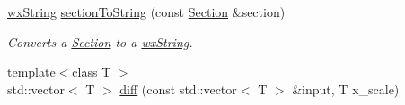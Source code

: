\begin{DoxyCompactItemize}
\hyperlink{classwxString}{wxString} \hyperlink{group__stfgen_ga9536c899dc7a569c55ba8957aec43613}{sectionToString} (const \hyperlink{classSection}{Section} \&section)
\begin{DoxyCompactList}\small\item\em Converts a \hyperlink{classSection}{Section} to a \hyperlink{classwxString}{wxString}. \item\end{DoxyCompactList}\item 
\hypertarget{group__stfgen_ga3892c35dfb30e27bdc9f6e178ebf064e}{
{\footnotesize template$<$class T $>$ }\\std::vector$<$ T $>$ \hyperlink{group__stfgen_ga3892c35dfb30e27bdc9f6e178ebf064e}{diff} (const std::vector$<$ T $>$ \&input, T x\_\-scale)}
\label{group__stfgen_ga3892c35dfb30e27bdc9f6e178ebf064e}


\end{DoxyCompactItemize}
